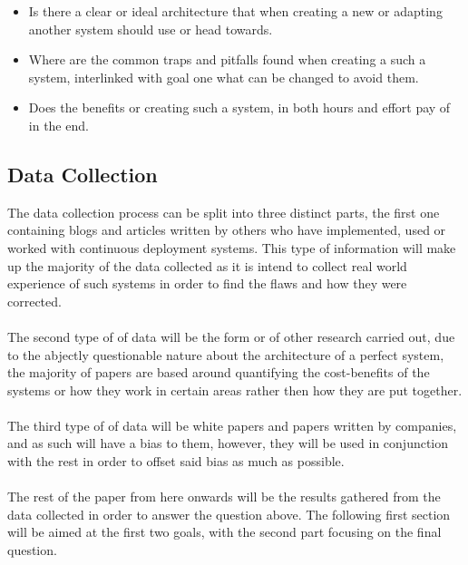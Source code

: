 \begin{itemize}
  \item Is there a clear or ideal architecture that when creating a new or adapting another system should use or head towards.\\
    \item Where are the common traps and pitfalls found when creating a such a system, interlinked  with goal one what can be changed to avoid them.\\
  \item Does the benefits or creating such a system, in both hours and effort pay of in the end. \\
\end{itemize}

\subsection{Data Collection}

The data collection process can be split into three distinct parts, the first one containing blogs and articles written by others who have implemented, used or worked with continuous deployment systems. This type of information will make up the majority of the data collected as it is intend to collect real world experience of such systems in order to find the flaws and how they were corrected.
\\\\
The second type of of data will be the form or of other research carried out, due to the abjectly questionable nature about the architecture of a perfect system, the majority of papers are based around quantifying the cost-benefits of the systems or how they work in certain areas rather then how they are put together. 
\\\\
The third type of of data will be white papers and papers written by companies, and as such will have a bias to them, however, they will be used in conjunction with the rest in order to offset said bias as much as possible.
\\\\
The rest of the paper from here onwards will be the results gathered from the data collected in order to answer the question above. The following first section will be aimed at the first two goals, with the second part focusing on the final question.